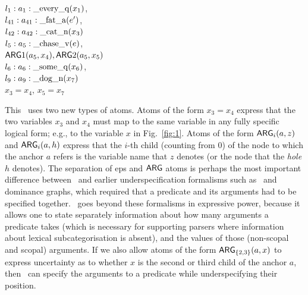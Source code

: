 \begin{examples}
\item 
$l_1:a_1:\mathrm{\_every\_q}(x_1)$, \\
$l_{41}:a_{41}:\mathrm{\_fat\_a}(e')$,\\
$l_{42}:a_{42}:\mathrm{\_cat\_n}(x_3)$\\
$l_5:a_5:\mathrm{\_chase\_v}(e)$, \\
\hspace*{0.1in} $\mathsf{ARG}1(a_5,x_4),
\mathsf{ARG}2(a_5,x_5)$\\ 
$l_6:a_6:\mathrm{\_some\_q}(x_6)$, \\
$l_9:a_9:\mathrm{\_dog\_n}(x_7)$\\
$x_3=x_4$, $x_5=x_7$
\label{ex:cat-partial-parser}
\end{examples}

This \rmrs\ uses two new types of atoms.  Atoms of the form $x_3=x_4$
express that the two variables $x_3$ and $x_4$ must map to the same
variable in any fully specific logical form; e.g., to the variable $x$
in Fig.~\ref{fig:1}.  Atoms of the form
$\mathsf{ARG}_i(a,z)$ and $\mathsf{ARG}_i(a,h)$ express that the $i$-th child
(counting from 0) of the
node to which the anchor $a$ refers is the variable name that $z$ denotes
(or the node that the {\em hole} $h$ denotes).  The separation of
{\sc ep}s and $\mathsf{ARG}$ atoms is perhaps the most important difference between
\rmrs\ and earlier underspecification formalisms such as \mrs\ and
dominance graphs, which required that a predicate and its arguments
had to be specified together.  \rmrs\ goes beyond these formalisms in
expressive power, because it allows one to state separately
information about how many arguments a predicate takes (which is
necessary for supporting parsers where information about lexical
subcategorisation is absent), and the values of
those (non-scopal and scopal) arguments.   If we also allow atoms of the form
$\mathsf{ARG}_{\{2,3\}}(a,x)$ to express uncertainty as to whether $x$ is the
second or third child of the anchor $a$, then \rmrs\ can specify the
arguments to a predicate while underspecifying their position. 

